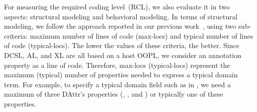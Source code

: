 For measuring the required coding level~(RCL), we also evaluate it in two aspects: structural modeling and behavioral modeling. In terms of structural modeling, we follow the approach reported in our previous work~\cite{le_domain_2018}, using two sub-criteria: maximum number of lines of code (max-locs) and typical number of lines of code (typical-locs). The lower the values of these criteria, the better. Since DCSL, AL, and XL are all based on a host OOPL, we consider an annotation property as a line of code. Therefore, max-locs (typical-locs) represent the maximum (typical) number of properties needed to express a typical domain term. For example, to specify a typical domain field such as  in \dcsl, we need a maximum of three DAttr's properties (, , and ) or typically one of these properties.


